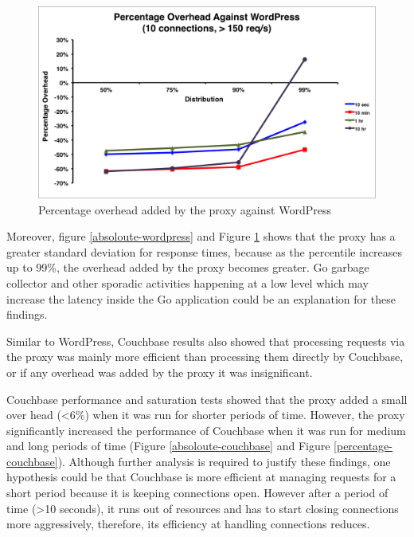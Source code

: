 \documentclass[a4paper,11pt,twoside]{report}
\begin{document}
\begin{figure}[!ht]
  \centering
     \includegraphics[scale=0.55]{percentage-wordpress}
  \caption{Percentage overhead added by the proxy against WordPress}
  \label{percentage-wordpress}
\end{figure} 

Moreover, figure \ref{absoloute-wordpress} and Figure \ref{percentage-wordpress} shows that the proxy has a greater standard deviation for response times, because as the percentile increases up to 99\%, the overhead added by the proxy becomes greater. Go garbage collector and other sporadic activities happening at a low level which may increase the latency inside the Go application could be an explanation for these findings.

Similar to WordPress, Couchbase results also showed that processing requests via the proxy was mainly more efficient than processing them directly by Couchbase, or if any overhead was added by the proxy it was insignificant.

Couchbase performance and saturation tests showed that the proxy added a small over head (<6\%) when it was run for shorter periods of time.  However, the proxy significantly increased the performance of Couchbase when it was run for medium and long periods of time (Figure \ref{absoloute-couchbase} and Figure \ref{percentage-couchbase}). Although further analysis is required to justify these findings, one hypothesis could be that Couchbase is more efficient at managing requests for a short period because it is keeping connections open. However after a period of time (>10 seconds), it runs out of resources and has to start closing connections more aggressively, therefore, its efficiency at handling connections reduces.
\end{document}
